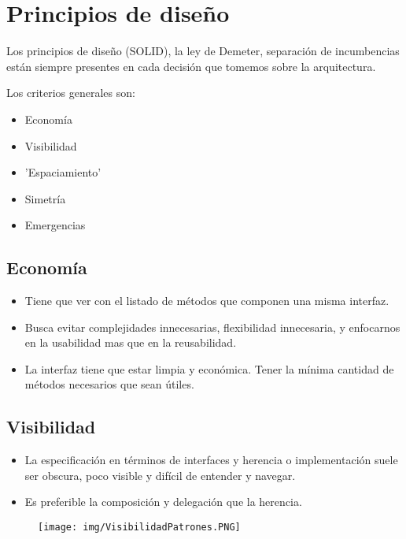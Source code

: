 \section{Principios de diseño}
Los principios de diseño (SOLID), la ley de Demeter, separación de incumbencias están siempre presentes en cada decisión que tomemos sobre la arquitectura.

Los criterios generales son:
\begin{itemize}
\item Economía
\item Visibilidad
\item 'Espaciamiento'
\item Simetría
\item Emergencias
\end{itemize}


\subsection*{Economía}
\begin{itemize}
\item Tiene que ver con el listado de métodos que componen una misma interfaz.
\item Busca evitar complejidades innecesarias, flexibilidad innecesaria, y enfocarnos en la usabilidad mas que en la reusabilidad.
\item La interfaz tiene que estar limpia y económica. Tener la mínima cantidad de métodos necesarios que sean útiles.
\end{itemize}


\subsection*{Visibilidad}

\begin{itemize}
\item La especificación en términos de interfaces y herencia o implementación suele ser obscura, poco visible y difícil de entender y navegar.
\item Es preferible la composición y delegación que la herencia.
\end{itemize}


\begin{figure}[!htb]
    \centering
    \texttt{[image: img/VisibilidadPatrones.PNG]}
\end{figure}

